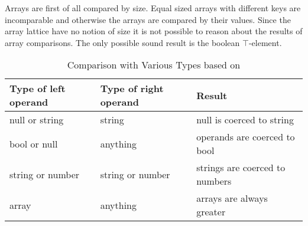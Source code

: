 Arrays are first of all compared by size. Equal sized arrays with different keys are incomparable and otherwise the arrays are compared by their values. Since the array lattice have no notion of size it is not possible to reason about the results of array comparisons. The only possible sound result is the boolean $\top$-element.


\begin{table}[htbp]
\centering
\begin{tabular}{l|l||l}
Type of left operand & Type of right operand & Result \\\hline\hline
null or string & string & null is coerced to string \\\hline
bool or null & anything & operands are coerced to bool \\\hline
string or number & string or number & strings are coerced to numbers \\\hline
array & anything & arrays are always greater
\end{tabular}
\caption{Comparison with Various Types based on \protect{}}
\label{tab:comparisons}
\end{table}
